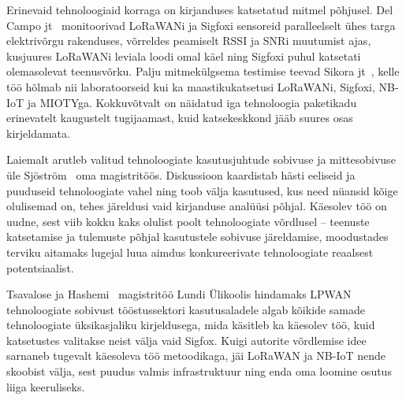 \documentclass[12pt]{article}
\begin{document}
    Erinevaid tehnoloogiaid korraga on kirjanduses katsetatud mitmel põhjusel.
    Del Campo jt~\cite{del2019hybrid} monitoorivad LoRaWANi ja Sigfoxi sensoreid paralleelselt ühes targa elektrivõrgu rakenduses, võrreldes peamiselt RSSI ja SNRi muutumist ajas, kusjuures LoRaWANi leviala loodi omal käel ning Sigfoxi puhul katsetati olemasolevat teenusvõrku.
    Palju mitmekülgsema testimise teevad Sikora jt~\cite{sikora2019test}, kelle töö hõlmab nii laboratoorseid kui ka maastikukatsetusi LoRaWANi, Sigfoxi, NB-IoT ja MIOTYga.
    Kokkuvõtvalt on näidatud iga tehnoloogia paketikadu erinevatelt kaugustelt tugijaamast, kuid katsekeskkond jääb suures osas kirjeldamata.

    Laiemalt arutleb valitud tehnoloogiate kasutusjuhtude sobivuse ja mittesobivuse üle Sjöström~\cite{sjostrom2017unlicensed} oma magistritöös.
    Diskussioon kaardistab hästi eeliseid ja puuduseid tehnoloogiate vahel ning toob välja kasutused, kus need nüansid kõige olulisemad on, tehes järeldusi vaid kirjanduse analüüsi põhjal.
    Käesolev töö on uudne, sest viib kokku kaks olulist poolt tehnoloogiate võrdlusel -- teenuste katsetamise ja tulemuste põhjal kasutustele sobivuse järeldamise, moodustades terviku aitamaks lugejal luua aimdus konkureerivate tehnoloogiate reaalsest potentsiaalist.


    Tsavalose ja Hashemi~\cite{tsavalos2018low} magistritöö Lundi Ülikoolis hindamaks LPWAN tehnoloogiate sobivust tööstussektori kasutusaladele algab kõikide samade tehnoloogiate üksikasjaliku kirjeldusega, mida käsitleb ka käesolev töö, kuid katsetustes valitakse neist välja vaid Sigfox.
    Kuigi autorite võrdlemise idee sarnaneb tugevalt käesoleva töö metoodikaga, jäi LoRaWAN ja NB-IoT nende skoobist välja, sest puudus valmis infrastruktuur ning enda oma loomine osutus liiga keeruliseks.
\end{document}
